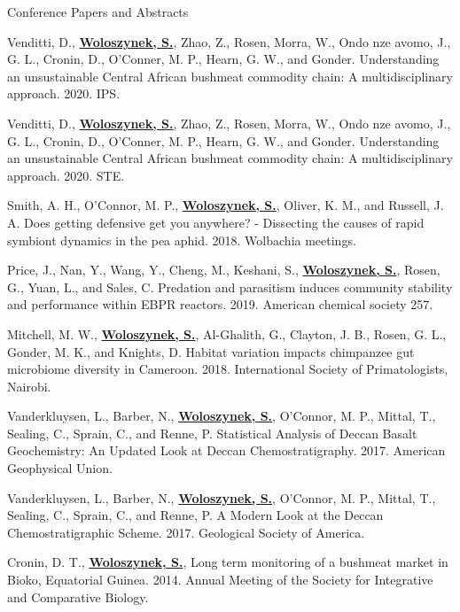 \begin{cventries}
\vspace{.5cm}
\cventry
    {}
    {Conference Papers and Abstracts}
    {}
    {}
    {
     \begin{cvitems} %
        \item{Venditti, D., \textbf{\underline{Woloszynek, S.}}, Zhao, Z., Rosen, Morra, W., Ondo nze avomo, J., G. L., Cronin, D., O’Conner, M. P., Hearn, G. W., and Gonder. Understanding an unsustainable Central African bushmeat commodity chain: A multidisciplinary approach. 2020. IPS.}
        \item{Venditti, D., \textbf{\underline{Woloszynek, S.}}, Zhao, Z., Rosen, Morra, W., Ondo nze avomo, J., G. L., Cronin, D., O’Conner, M. P., Hearn, G. W., and Gonder. Understanding an unsustainable Central African bushmeat commodity chain: A multidisciplinary approach. 2020. STE.}
        \item{Smith, A. H., O’Connor, M. P., \textbf{\underline{Woloszynek, S.}}, Oliver, K. M., and Russell, J. A. Does getting defensive get you anywhere? - Dissecting the causes of rapid symbiont dynamics in the pea aphid. 2018. Wolbachia meetings.}
        \item{Price, J., Nan, Y., Wang, Y., Cheng, M., Keshani, S., \textbf{\underline{Woloszynek, S.}}, Rosen, G., Yuan, L., and Sales, C. Predation and parasitism induces community stability and performance within EBPR reactors. 2019. American chemical society 257.}
        \item{Mitchell, M. W., \textbf{\underline{Woloszynek, S.}}, Al-Ghalith, G., Clayton, J. B., Rosen, G. L., Gonder, M. K., and Knights, D. Habitat variation impacts chimpanzee gut microbiome diversity in Cameroon. 2018. International Society of Primatologists, Nairobi.}
        \item{Vanderkluysen, L., Barber, N., \textbf{\underline{Woloszynek, S.}}, O’Connor, M. P., Mittal, T., Sealing, C., Sprain, C., and Renne, P. Statistical Analysis of Deccan Basalt Geochemistry: An Updated Look at Deccan Chemostratigraphy. 2017. American Geophysical Union.}
        \item{Vanderkluysen, L., Barber, N., \textbf{\underline{Woloszynek, S.}}, O’Connor, M. P., Mittal, T., Sealing, C., Sprain, C., and Renne, P. A Modern Look at the Deccan Chemostratigraphic Scheme. 2017. Geological Society of America.}
         \item{Cronin, D. T., \textbf{\underline{Woloszynek, S.}}, Long term monitoring of a bushmeat market in Bioko, Equatorial Guinea. 2014. Annual Meeting of the Society for Integrative and Comparative Biology.}
      \end{cvitems}
    }
    

\end{cventries}
